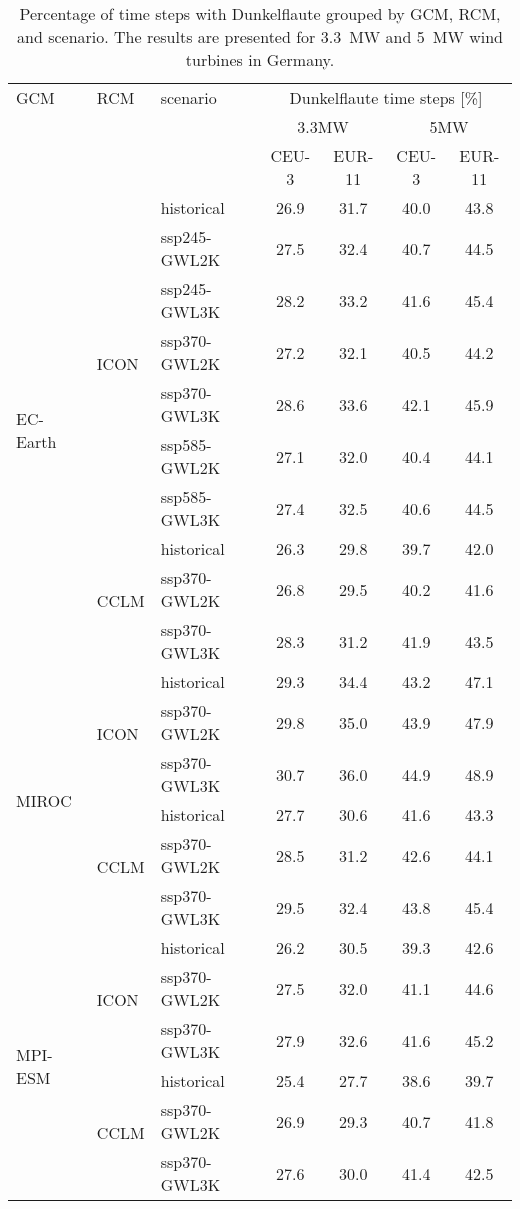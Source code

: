 \begin{table}[!htbp]
\centering
\caption{Percentage of time steps with Dunkelflaute grouped by GCM, RCM, and scenario. The results are presented for \qty{3.3}{\mega\watt} and \qty{5}{\mega\watt} wind turbines in Germany.}
\label{Table:Dunkelflaute_changes}
\begin{tabular}{lll|cc|cc}
\toprule
GCM & RCM & scenario & \multicolumn{4}{c}{Dunkelflaute time steps [\%]} \\
 & & & \multicolumn{2}{c}{3.3\si{\mega\watt}} & \multicolumn{2}{c}{5\si{\mega\watt}} \\
 & & & CEU-3 & EUR-11 & CEU-3 & EUR-11 \\
\midrule
\cmidrule(lr){1-7}
\multirow{10}{*}{EC-Earth} & \multirow{7}{*}{ICON} & historical & 26.9 & 31.7 & 40.0 & 43.8 \\
 &  & ssp245-GWL2K & 27.5 & 32.4 & 40.7 & 44.5 \\
 &  & ssp245-GWL3K & 28.2 & 33.2 & 41.6 & 45.4 \\
 &  & ssp370-GWL2K & 27.2 & 32.1 & 40.5 & 44.2 \\
 &  & ssp370-GWL3K & 28.6 & 33.6 & 42.1 & 45.9 \\
 &  & ssp585-GWL2K & 27.1 & 32.0 & 40.4 & 44.1 \\
 &  & ssp585-GWL3K & 27.4 & 32.5 & 40.6 & 44.5 \\
\cmidrule(lr){2-7}
 & \multirow{3}{*}{CCLM} & historical & 26.3 & 29.8 & 39.7 & 42.0 \\
 &  & ssp370-GWL2K & 26.8 & 29.5 & 40.2 & 41.6 \\
 &  & ssp370-GWL3K & 28.3 & 31.2 & 41.9 & 43.5 \\
\cmidrule(lr){2-7}
\multirow{6}{*}{MIROC} & \multirow{3}{*}{ICON} & historical & 29.3 & 34.4 & 43.2 & 47.1 \\
 &  & ssp370-GWL2K & 29.8 & 35.0 & 43.9 & 47.9 \\
 &  & ssp370-GWL3K & 30.7 & 36.0 & 44.9 & 48.9 \\
\cmidrule(lr){2-7}
 & \multirow{3}{*}{CCLM} & historical & 27.7 & 30.6 & 41.6 & 43.3 \\
 &  & ssp370-GWL2K & 28.5 & 31.2 & 42.6 & 44.1 \\
 &  & ssp370-GWL3K & 29.5 & 32.4 & 43.8 & 45.4 \\
\cmidrule(lr){2-7}
\multirow{6}{*}{MPI-ESM} & \multirow{3}{*}{ICON} & historical & 26.2 & 30.5 & 39.3 & 42.6 \\
 &  & ssp370-GWL2K & 27.5 & 32.0 & 41.1 & 44.6 \\
 &  & ssp370-GWL3K & 27.9 & 32.6 & 41.6 & 45.2 \\
\cmidrule(lr){2-7}
 & \multirow{3}{*}{CCLM} & historical & 25.4 & 27.7 & 38.6 & 39.7 \\
 &  & ssp370-GWL2K & 26.9 & 29.3 & 40.7 & 41.8 \\
 &  & ssp370-GWL3K & 27.6 & 30.0 & 41.4 & 42.5 \\
\bottomrule
\end{tabular}
\end{table}